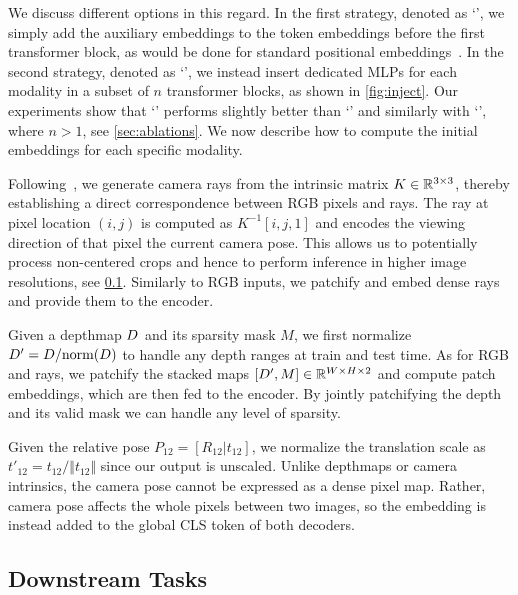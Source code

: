 We discuss different options in this regard. 
In the first strategy, denoted as `\embed{}', we simply add the auxiliary embeddings to the token embeddings before the first transformer block, as would be done for standard positional embeddings~\cite{vit}.
In the second strategy, denoted as `', we instead insert dedicated MLPs for each modality in a subset of $n$ transformer blocks, as shown in \cref{fig:inject}.
Our experiments show that `' performs slightly better than `\embed{}' and similarly with `', where $n>1$, see \cref{sec:ablations}.
We now describe how to compute the initial embeddings for each specific modality.


Following~\cite{raydiffusion}, we generate camera rays from the intrinsic matrix $K\in\mathbb{R}^{3\times 3}$, thereby establishing a direct correspondence between RGB pixels and rays. 
The ray at pixel location $(i,j)$ is computed as $K^{-1} [i, j, 1]$ and encodes the viewing direction of that pixel \wrt the current camera pose.
This allows us to potentially process non-centered crops and hence to perform inference in higher image resolutions, see \cref{sec:applications}.
Similarly to RGB inputs, we patchify and embed dense rays and provide them to the encoder.



Given a depthmap $D^{}$ and its sparsity mask $M$, we first normalize $D'=D/\text{norm}(D)$ to handle any depth ranges at train and test time. 
As for RGB and rays, we patchify the stacked maps $[D',M]\in\mathbb{R}^{W\times H\times 2}$ and compute patch embeddings, which are then fed to the encoder.
By jointly patchifying the depth and its valid mask we can handle any level of sparsity. %

Given the relative pose $P_{12}=[R_{12}|t_{12}]$, we normalize the translation scale as $t'_{12} = t_{12} / \Vert t_{12} \Vert$ since our output is unscaled. %
Unlike depthmaps or camera intrinsics, the camera pose cannot be expressed as a dense pixel map. %
Rather, camera pose affects the whole pixels between two images, so the embedding is instead added to the global CLS token of both decoders. %










\subsection{Downstream Tasks}
\label{sec:applications}


